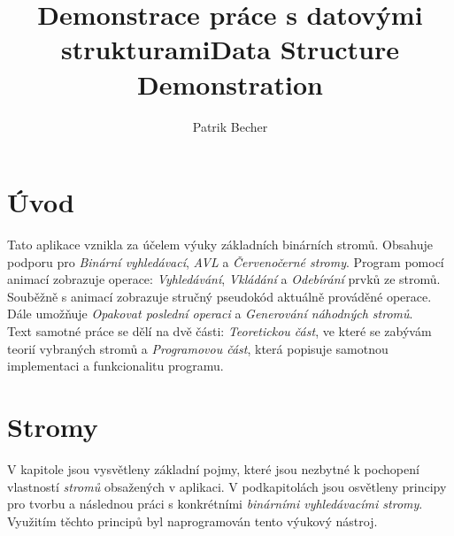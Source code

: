 \documentclass[
  biblatex=false,
  font=serif,
  glossaries=false,
  tables=false,
  theorems=false,
  index
]{kidiplom}
\title{Demonstrace práce s datovými strukturami}
\title[english]{Data Structure Demonstration}
\author{Patrik Becher}
\begin{document}


\maketitle





\section{Úvod}
Tato aplikace vznikla za účelem výuky základních binárních stromů. Obsahuje podporu pro \textit{Binární vyhledávací}, \textit{AVL} a \textit{Červenočerné stromy}. Program pomocí animací zobrazuje operace: \textit{Vyhledávání}, \textit{Vkládání} a \textit{Odebírání} prvků ze stromů. Souběžně s animací zobrazuje stručný pseudokód aktuálně prováděné operace. Dále umožňuje \textit{Opakovat poslední operaci} a \textit{Generování náhodných stromů}.\\

Text samotné práce se dělí na dvě části: \textit{Teoretickou část}, ve které se zabývám teorií vybraných stromů a \textit{Programovou část}, která popisuje samotnou implementaci a funkcionalitu programu.\\

\newpage
\section{Stromy}
V kapitole jsou vysvětleny základní pojmy, které jsou nezbytné k pochopení vlastností \textit{stromů} obsažených v aplikaci. V podkapitolách jsou osvětleny principy pro tvorbu a následnou práci s konkrétními \textit{binárními vyhledávacími stromy}. Využitím těchto principů byl naprogramován tento výukový nástroj.\\
\end{document}
